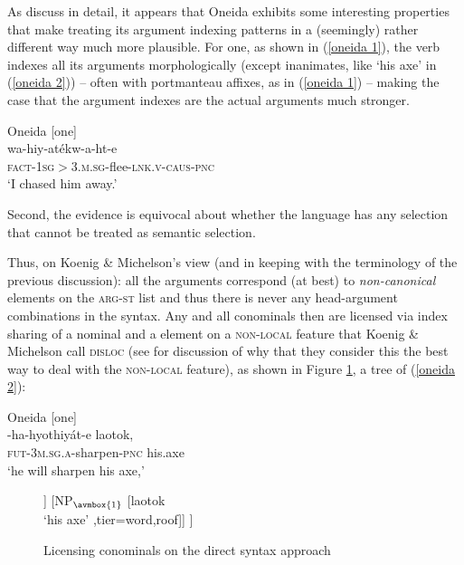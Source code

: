 \documentclass[output=paper]{langsci/langscibook}
\begin{document}
{As \citet{KM15} discuss in detail, it appears that Oneida exhibits some interesting properties that make treating its argument indexing patterns in a (seemingly) rather different way much more plausible. For one, as shown in (\ref{oneida 1}), the verb indexes all its arguments morphologically (except inanimates, like `his axe' in (\ref{oneida 2}))  -- often with portmanteau affixes, as in (\ref{oneida 1})  --  making the case that the argument indexes are the actual arguments much stronger. 
%
\begin{exe}
\ex\label{oneida 1} Oneida [one] \citep[5]{KM15} \\
\gll wa-hiy-at\'{e}{\textperiodcentered}kw-a-ht-e \\
\textsc{fact}-\textsc{1sg$>$3.m.sg}-flee-\textsc{lnk.v}-\textsc{caus}-\textsc{pnc} \\
\glt `I chased him away.' 
\end{exe} 
%
Second, the evidence is equivocal about whether the language has any selection that cannot be treated as semantic selection.

Thus, on Koenig \& Michelson's view (and in keeping with the terminology of the previous discussion): all the arguments correspond (at best) to \textit{non-canonical} elements on the \textsc{arg-st} list and thus there is never any head-argument combinations in the syntax. Any and all conominals then are licensed via index sharing of a nominal and a element on a \textsc{non-local} feature that Koenig \& Michelson call  \textsc{disloc} (see \citet[39]{KM15} for discussion of why that they consider this the best way to deal with  the \textsc{non-local} feature), as shown in Figure \ref{nonlocal tree}, a tree of (\ref{oneida 2}):
\begin{exe}
\ex\label{oneida 2} Oneida [one] \citep[17]{KM15} \\
\gll {}-ha-hyothi{\textperiodcentered}y\'{a}t-e laoto{\textperiodcentered}k,\\
\textsc{fut}-\textsc{3m.sg.a}-sharpen-\textsc{pnc} his.axe \\
\glt `he will sharpen his axe,'
\end{exe} 
%
\begin{figure}[htp]
\centering
\begin{forest}
[ \begin{avm}
\[ \textsc{head} & \textit{verb} \\
   \textsc{disloc} & \esetDB \]
\end{avm} 
	[ \begin{avm}
    	 \[ \textsc{head} & \textit{verb} \\
   	\textsc{disloc} & \q\{ \@1 \q\}     \]
   	\end{avm}
	[\textipa{2}hahyo\textipa{P}thi{\textperiodcentered}y\'{a}te\textipa{P} \\ `he will sharpen' , tier=word]]
	[NP$_{\avmbox{1}}$ [laoto{\textperiodcentered}k \\ `his axe' ,tier=word,roof]] ]
\end{forest}
\caption{Licensing conominals on the direct syntax approach}
\label{nonlocal tree}
\end{figure}
 

}
\end{document}
